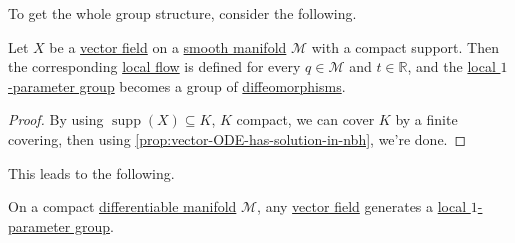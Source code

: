 To get the whole group structure, consider the following.

\begin{theorem}
	Let \(X\) be a \hyperref[def:vector-field]{vector field} on a \hyperref[def:smooth-manifold]{smooth manifold} \(\mathcal{M} \) with a compact support. Then the corresponding \hyperref[def:local-flow]{local flow} is defined for every \(q\in \mathcal{M} \) and \(t\in \mathbb{R} \), and the \hyperref[def:local-1-parameter-group]{local \(1\)-parameter group} becomes a group of \hyperref[def:diffeomorphism]{diffeomorphisms}.
\end{theorem}
\begin{proof}
	By using \(\mathop{\mathrm{supp}}(X) \subseteq K\), \(K\) compact, we can cover \(K\) by a finite covering, then using \autoref{prop:vector-ODE-has-solution-in-nbh}, we're done.
\end{proof}

This leads to the following.

\begin{corollary}
	On a compact \hyperref[def:smooth-manifold]{differentiable manifold} \(\mathcal{M} \), any \hyperref[def:vector-field]{vector field} generates a \hyperref[def:local-1-parameter-group]{local \(1\)-parameter group}.
\end{corollary}